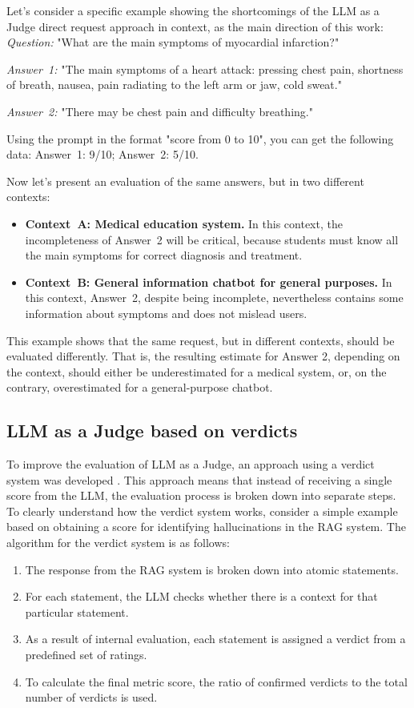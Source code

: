 \documentclass[sn-basic]{sn-jnl}
\theoremstyle{thmstyleone}%
\theoremstyle{thmstyletwo}%
\theoremstyle{thmstylethree}%
\begin{document}
Let's consider a specific example showing the shortcomings of the LLM as a Judge direct request approach in context, as the main direction of this work: 
\textit{Question:} "What are the main symptoms of myocardial infarction?" 

\textit{Answer~1:} "The main symptoms of a heart attack: pressing chest pain, shortness of breath, nausea, pain radiating to the left arm or jaw, cold sweat." 

\textit{Answer~2:} "There may be chest pain and difficulty breathing." 

Using the prompt in the format "score from 0 to 10", you can get the following data: 
Answer~1: 9/10; Answer~2: 5/10.

Now let's present an evaluation of the same answers, but in two different contexts: 
\begin{itemize} 
\item \textbf{Context~A: Medical education system.} In this context, the incompleteness of Answer~2 will be critical, because students must know all the main symptoms for correct diagnosis and treatment. 
\item \textbf{Context~B: General information chatbot for general purposes.} In this context, Answer~2, despite being incomplete, nevertheless contains some information about symptoms and does not mislead users.
 \end{itemize}

This example shows that the same request, but in different contexts, should be evaluated differently. That is, the resulting estimate for Answer 2, depending on the context, should either be underestimated for a medical system, or, on the contrary, overestimated for a general-purpose chatbot.

\subsection{LLM as a Judge based on verdicts}

To improve the evaluation of LLM as a Judge, an approach using a verdict system was developed \cite{Yu2024evaluation,Gan2025rag,Roychowdhury2024}. This approach means that instead of receiving a single score from the LLM, the evaluation process is broken down into separate steps. To clearly understand how the verdict system works, consider a simple example based on obtaining a score for identifying hallucinations in the RAG system. The algorithm for the verdict system is as follows:

\begin{enumerate} 
\item The response from the RAG system is broken down into atomic statements. 
\item For each statement, the LLM checks whether there is a context for that particular statement. 
\item As a result of internal evaluation, each statement is assigned a verdict from a predefined set of ratings.
\item To calculate the final metric score, the ratio of confirmed verdicts to the total number of verdicts is used.
\end{enumerate}
\end{document}
